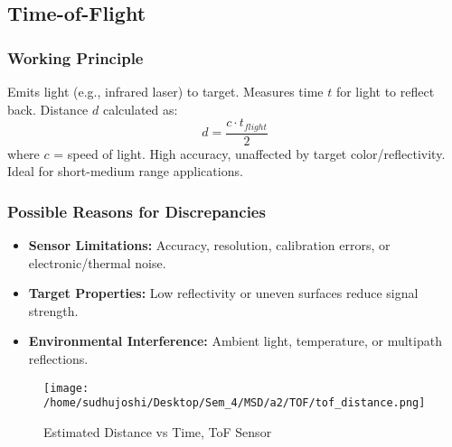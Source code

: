 \documentclass[a4paper]{article}
\begin{document}
\subsection{Time-of-Flight}
\subsubsection*{Working Principle}

Emits light (e.g., infrared laser) to target. Measures time \( t \) for light to reflect back. Distance \( d \) calculated as:
\[
d = \frac{c \cdot t_{flight}}{2}
\]
where \( c \) = speed of light. 
High accuracy, unaffected by target color/reflectivity. Ideal for short-medium range applications.

\subsubsection*{Possible Reasons for Discrepancies}
\begin{itemize}
    \item \textbf{Sensor Limitations:} Accuracy, resolution, calibration errors, or electronic/thermal noise.
    \item \textbf{Target Properties:} Low reflectivity or uneven surfaces reduce signal strength.
    \item \textbf{Environmental Interference:} Ambient light, temperature, or multipath reflections.
\end{itemize}

\begin{figure}[H]
    \centering
    \texttt{[image: /home/sudhujoshi/Desktop/Sem\_4/MSD/a2/TOF/tof\_distance.png]}
    \caption{Estimated Distance vs Time, ToF Sensor} 
\end{figure}
\end{document}

